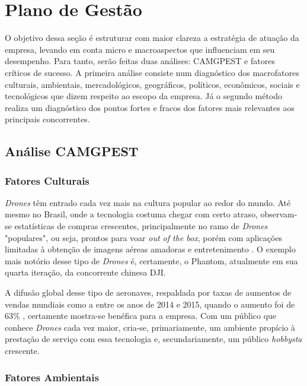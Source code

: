 \section{Plano de Gestão}

O objetivo dessa seção é estruturar com maior clareza a estratégia de atuação da empresa,
levando em conta micro e macroaspectos que influenciam em seu desempenho. Para tanto, serão 
feitas duas análises: CAMGPEST e fatores críticos de sucesso. A primeira análise consiste num 
diagnóstico dos macrofatores culturais, ambientais, mercadológicos, geográficos, políticos, 
econômicos, sociais e tecnológicos que dizem respeito ao escopo da empresa. Já o segundo método 
realiza um diagnóstico dos pontos fortes e fracos dos fatores mais relevantes aos principais 
concorrentes.

\subsection{Análise CAMGPEST}

\subsubsection*{Fatores Culturais}

\emph{Drones} têm entrado cada vez mais na cultura popular ao redor do mundo. Até mesmo no Brasil, 
onde a tecnologia costuma chegar com certo atraso, observam-se estatísticas de compras crescentes, 
principalmente no ramo de \emph{Drones} "populares", ou seja, prontos para voar \emph{out of the box}, porém com 
aplicações limitadas à obtenção de imagens aéreas amadoras e entretenimento \cite{brasildrones}. 
O exemplo mais notório desse tipo de \emph{Drones} é, 
certamente, o Phantom, atualmente em sua quarta iteração, da concorrente chinesa DJI.

A difusão global desse tipo de aeronaves, respaldada por taxas de aumentos de vendas mundiais 
como a entre os anos de 2014 e 2015, quando o aumento foi de 63\% \cite{dronestats}, certamente 
mostra-se benéfica para a empresa. Com um público que conhece \emph{Drones} cada vez maior, cria-se, 
primariamente, um ambiente propício à prestação de serviço com essa tecnologia e, secundariamente, 
um público \emph{hobbysta} crescente.

\subsubsection*{Fatores Ambientais}

